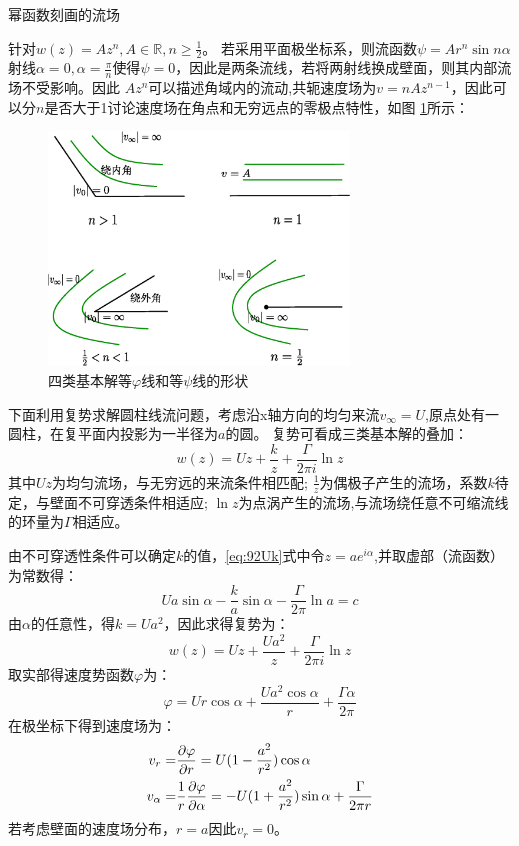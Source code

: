 幂函数刻画的流场

针对$w(z)=Az^n,A\in \mathbb{R},n\geq \frac{1}{2}$。
若采用平面极坐标系，则流函数$\psi=Ar^n \sin n\alpha$
射线$\alpha=0,\alpha=\frac{\pi}{n}$使得$\psi=0$，因此是两条流线，若将两射线换成壁面，则其内部流场不受影响。因此
$Az^n$可以描述角域内的流动,共轭速度场为$v=nAz^{n-1}$，因此可以分$n$是否大于1讨论速度场在角点和无穷远点的零极点特性，如图
\ref{fig:powerComplexFunctionField}所示：

\begin{figure}[!ht]
 \centering
 \includegraphics[width=8cm]{powerComplexFunctionField.eps}
 \caption{四类基本解等$\varphi$线和等$\psi$线的形状}\label{fig:powerComplexFunctionField}
\end{figure}

下面利用复势求解圆柱线流问题，考虑沿x轴方向的均匀来流$v_{\infty}=U$,原点处有一圆柱，在复平面内投影为一半径为$a$的圆。
复势可看成三类基本解的叠加：
\begin{equation}\label{eq:92Uk}
w(z)=Uz+\frac{k}{z}+\frac{\Gamma}{2\pi i}\ln z
\end{equation}
其中$Uz$为均匀流场，与无穷远的来流条件相匹配;
$\frac{1}{z}$为偶极子产生的流场，系数$k$待定，与壁面不可穿透条件相适应;
$\ln z$为点涡产生的流场,与流场绕任意不可缩流线的环量为$\Gamma$相适应。

由不可穿透性条件可以确定$k$的值，\eqref{eq:92Uk}式中令$z=ae^{i\alpha}$,并取虚部（流函数）为常数得：
\begin{equation}\label{eq:92PotentialAroundCylinder}
Ua\sin\alpha-\frac{k}{a}\sin\alpha-\frac{\Gamma}{2\pi}\ln a=c
\end{equation}
由$\alpha$的任意性，得$k=Ua^2$，因此求得复势为：
\begin{equation}
w(z)=Uz+\frac{Ua^2}{z}+\frac{\Gamma}{2\pi i}\ln z
\end{equation}
取实部得速度势函数$\varphi$为：
\begin{equation}
\varphi=Ur\cos\alpha+\frac{Ua^2\cos\alpha}{r}+\frac{\Gamma \alpha}{2\pi}
\end{equation}
在极坐标下得到速度场为：
\begin{align}\notag
v_r =& \frac{\partial \varphi}{\partial r}=U(1-\frac{a^2}{r^2})\cos\alpha\\
v_{\alpha} = & \frac{1}{r}\frac{\partial \varphi}{\partial \alpha}=-U(1+\frac{a^2}{r^2})\sin\alpha+\frac{\Gamma}{2\pi r}
\end{align}
若考虑壁面的速度场分布，$r=a$因此$v_r=0$。

